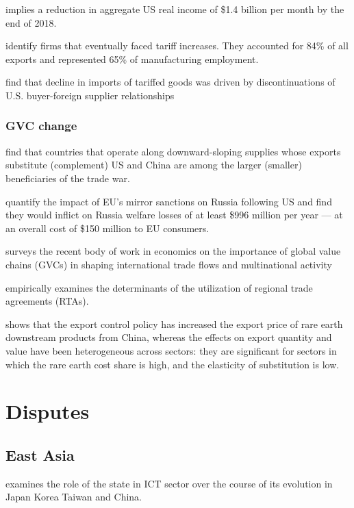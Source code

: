\documentclass[10pt]{article} %
\begin{document}
        \cite{AmitiReddingWeinstein2019} implies a reduction in aggregate US real income of \$1.4 billion per month by the end of 2018.

        \cite{HandleyKamalMonarch2020} identify firms that eventually faced tariff increases. They accounted for 84\% of all exports and represented 65\% of manufacturing employment.

        \cite{HandleyKamalMonarch2023} find that decline in imports of tariffed goods was driven by discontinuations of U.S. buyer-foreign supplier relationships

        \subsubsection{GVC change}
        \cite{FajgelbaumGoldbergKennedyKhandelwalTaglioni2021} find that countries that operate along downward-sloping supplies whose exports substitute (complement) US and China are among the larger (smaller) beneficiaries of the trade war.

        \cite{Latipovetal2022} quantify the impact of EU's mirror sanctions on Russia following US and find they would inflict on Russia welfare losses of at least \$996 million per year — at an overall cost of \$150 million to EU consumers.

        \cite{AntrasChor2022} surveys the recent body of work in economics on the importance of global value chains (GVCs) in shaping international trade flows and multinational activity

        \cite{Changetal2022} empirically examines the determinants of the utilization of regional trade agreements (RTAs).

        \cite{ChenHuLi2021} shows that the export control policy has increased the export price of rare earth downstream products from China, whereas the effects on export quantity and value have been heterogeneous across sectors: they are significant for sectors in which the rare earth cost share is high, and the elasticity of substitution is low.



    

\section{Disputes}
    \subsection{East Asia}
    \cite{Ning2008} examines the role of the state in ICT sector over the course of its evolution in Japan Korea Taiwan and China. 
\end{document}
